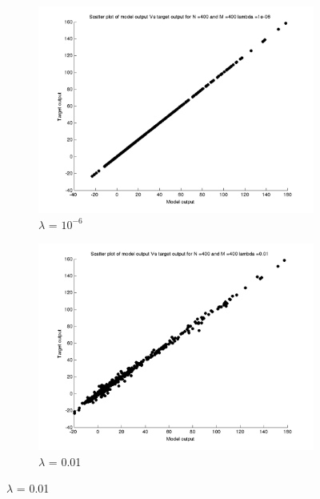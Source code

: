 \documentclass{article}
\begin{document}
\begin{figure}[H]

\begin{subfigure}{.5\textwidth}
\centering
\includegraphics[width=\linewidth]{D2/Scatter/Varyinglambda_N400M400lambda1e-06}
\caption{$\lambda$ = $10^{-6}$}
\end{subfigure}
\begin{subfigure}{.5\textwidth}
\includegraphics[width=\linewidth]{D2/Scatter/Varyinglambda_N400M400lambda0_01}
\caption{$\lambda$ = 0.01}
\end{subfigure}



\end{figure}
\end{document}
